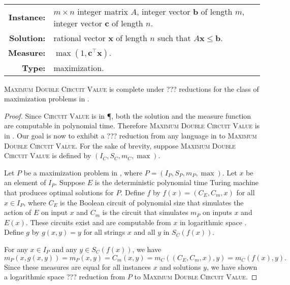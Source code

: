 \documentclass[]{article}
\begin{document}
\begin{definition}
  \mbox{} \\
  \begin{tabular}{r p{9.5cm}}
    \textbf{Instance:} & $m \times n$ integer matrix $A$, integer vector $\mathbf{b}$ of length $m$, integer vector $\mathbf{c}$ of length $n$. \\
    \textbf{Solution:} & rational vector $\mathbf{x}$ of length $n$ such that $A \mathbf{x} \leq \mathbf{b}$. \\
    \textbf{Measure:} & $\max(1, \mathbf{c}^\intercal \mathbf{x})$. \\
    \textbf{Type:} & maximization.
  \end{tabular}
\end{definition}

\begin{theorem}
  \textsc{Maximum Double Circuit Value} is complete under ??? reductions for the class of maximization problems in \PO.
\end{theorem}
\begin{proof}
  Since \textsc{Circuit Value} is in \P, both the solution and the measure function are computable in polynomial time.
  Therefore \textsc{Maximum Double Circuit Value} is in \PO.
  Our goal is now to exhibit a ??? reduction from any language in \PO{} to \textsc{Maximum Double Circuit Value}.
  For the sake of brevity, suppose \textsc{Maximum Double Circuit Value} is defined by $(I_C, S_C, m_C, \max)$.

  Let $P$ be a maximization problem in \PO, where $P = (I_P, S_P, m_P, \max)$.
  Let $x$ be an element of $I_P$.
  Suppose $E$ is the deterministic polynomial time Turing machine that produces optimal solutions for $P$.
  Define $f$ by $f(x) = (C_E, C_m, x)$ for all $x \in I_P$, where $C_E$ is the Boolean circuit of polynomial size that simulates the action of $E$ on input $x$ and $C_m$ is the circuit that simulates $m_P$ on inputs $x$ and $E(x)$.
  These circuits exist and are computable from $x$ in logarithmic space \cite{ladner75}.
  Define $g$ by $g(x, y) = y$ for all strings $x$ and all $y$ in $S_C(f(x))$.

  For any $x \in I_P$ and any $y \in S_C(f(x))$, we have
  \begin{equation*}
    m_P(x, g(x, y)) = m_P(x, y) = C_m(x, y) = m_C((C_E, C_m, x), y) = m_C(f(x), y).
  \end{equation*}
  Since these measures are equal for all instances $x$ and solutions $y$, we have shown a logarithmic space ??? reduction from $P$ to \textsc{Maximum Double Circuit Value}.
\end{proof}
\end{document}
